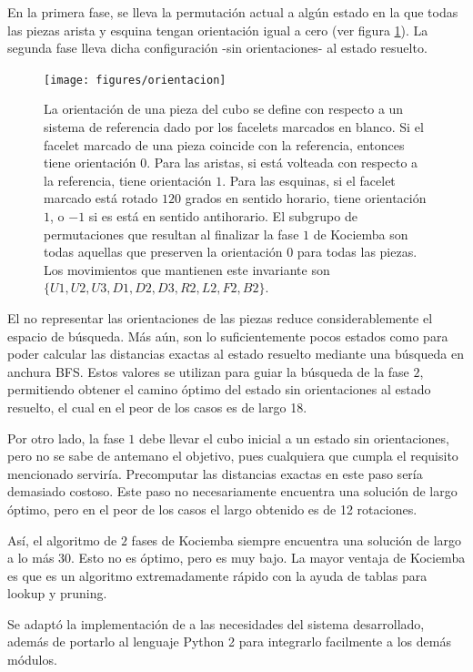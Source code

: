 En la primera fase, se lleva la permutación actual a algún estado en la que todas las piezas arista y esquina tengan orientación igual a cero (ver figura \ref{orientation}). La segunda fase lleva dicha configuración -sin orientaciones- al estado resuelto.

\begin{figure}[h!]
	\centering
	\texttt{[image: figures/orientacion]}
	\caption[Definición de orientación.]{La orientación de una pieza del cubo se define con respecto a un sistema de referencia dado por los facelets marcados en blanco. Si el facelet marcado de una pieza coincide con la referencia, entonces tiene orientación $0$. Para las aristas, si está volteada con respecto a la referencia, tiene orientación $1$. Para las esquinas, si el facelet marcado está rotado $120$ grados en sentido horario, tiene orientación $1$, o $-1$ si es está en sentido antihorario. El subgrupo de permutaciones que resultan al finalizar la fase $1$ de Kociemba son todas aquellas que preserven la orientación $0$ para todas las piezas. Los movimientos que mantienen este invariante son $\{U1, U2, U3, D1, D2, D3, R2, L2, F2, B2\}$.}
	\label{orientation}
\end{figure}
El no representar las orientaciones de las piezas reduce considerablemente el espacio de búsqueda. Más aún, son lo suficientemente pocos estados como para poder calcular las distancias exactas al estado resuelto mediante una búsqueda en anchura BFS\cite{ida}. Estos valores se utilizan para guiar la búsqueda de la fase $2$, permitiendo obtener el camino óptimo del estado sin orientaciones al estado resuelto, el cual en el peor de los casos es de largo 18.

Por otro lado, la fase $1$ debe llevar el cubo inicial a un estado sin orientaciones, pero no se sabe de antemano el objetivo, pues cualquiera que cumpla el requisito mencionado serviría. Precomputar las distancias exactas en este paso sería demasiado costoso. Este paso no necesariamente encuentra una solución de largo óptimo, pero en el peor de los casos el largo obtenido es de 12 rotaciones.

Así, el algoritmo de $2$ fases de Kociemba siempre encuentra una solución de largo a lo más $30$. Esto no es óptimo, pero es muy bajo. La mayor ventaja de Kociemba es que es un algoritmo extremadamente rápido con la ayuda de tablas para lookup y pruning.

Se adaptó la implementación de \cite{cubeexplorer} a las necesidades del sistema desarrollado, además de portarlo al lenguaje Python 2 para integrarlo facilmente a los demás módulos.

